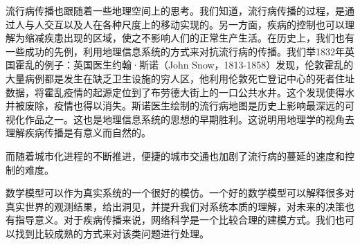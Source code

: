 流行病传播也跟随着一些地理空间上的思考。我们知道，流行病传播的过程，是通过人与人交互以及人在各种尺度上的移动实现的\cite{belik2011natural}。另一方面，疾病的控制也可以理解为缩减疾患出现的区域，使之不影响人们的正常生产生活。在历史上，我们也有一些成功的先例，利用地理信息系统的方式来对抗流行病的传播。我们举1832年英国霍乱的例子：英国医生约翰·斯诺（John Snow，1813-1858）发现，伦敦霍乱的大量病例都是发生在缺乏卫生设施的穷人区，他利用伦敦死亡登记中心的死者住址数据，将霍乱疫情的起源定位到了布劳德大街上的一口公共水井。这个发现使得水井被废除，疫情也得以消失。斯诺医生绘制的流行病地图是历史上影响最深远的可视化作品之一。这也是地理信息系统的思想的早期胜利。这说明用地理学的视角去理解疾病传播是有意义而自然的。

而随着城市化进程的不断推进，便捷的城市交通也加剧了流行病的蔓延的速度和控制的难度。

数学模型可以作为真实系统的一个很好的模仿。一个好的数学模型可以解释很多对真实世界的观测结果，给出洞见，并提升我们对系统本质的理解，对未来的决策也有指导意义。对于疾病传播来说，网络科学是一个比较合理的建模方式。我们也可以找到比较成熟的方式来对该类问题进行处理\cite{kiss2017mathematics}。